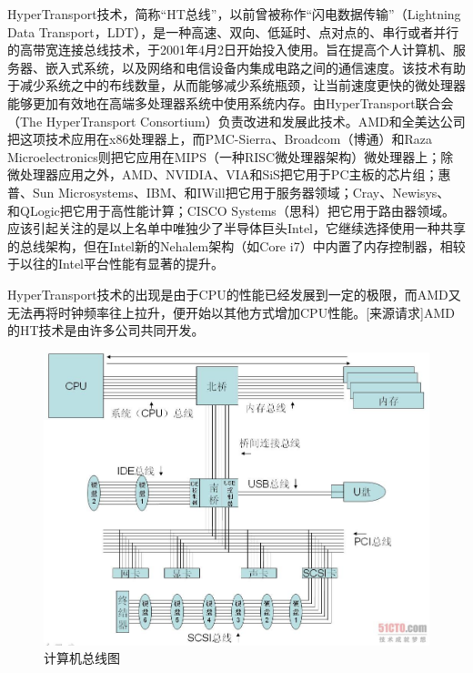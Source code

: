 HyperTransport技术，简称“HT总线”，以前曾被称作“闪电数据传输”（Lightning Data Transport，LDT），是一种高速、双向、低延时、点对点的、串行或者并行的高带宽连接总线技术，于2001年4月2日开始投入使用。旨在提高个人计算机、服务器、嵌入式系统，以及网络和电信设备内集成电路之间的通信速度。该技术有助于减少系统之中的布线数量，从而能够减少系统瓶颈，让当前速度更快的微处理器能够更加有效地在高端多处理器系统中使用系统内存。由HyperTransport联合会（The HyperTransport Consortium）负责改进和发展此技术。AMD和全美达公司把这项技术应用在x86处理器上，而PMC-Sierra、Broadcom（博通）和Raza Microelectronics则把它应用在MIPS（一种RISC微处理器架构）微处理器上；除微处理器应用之外，AMD、NVIDIA、VIA和SiS把它用于PC主板的芯片组；惠普、Sun Microsystems、IBM、和IWill把它用于服务器领域；Cray、Newisys、 和QLogic把它用于高性能计算；CISCO Systems（思科）把它用于路由器领域。应该引起关注的是以上名单中唯独少了半导体巨头Intel，它继续选择使用一种共享的总线架构，但在Intel新的Nehalem架构（如Core i7）中内置了内存控制器，相较于以往的Intel平台性能有显著的提升。

HyperTransport技术的出现是由于CPU的性能已经发展到一定的极限，而AMD又无法再将时钟频率往上拉升，便开始以其他方式增加CPU性能。[来源请求]AMD的HT技术是由许多公司共同开发。


\begin{figure}[htb]
\centering
\includegraphics[keepaspectratio,width=0.5\paperwidth]{Pictures/g.jpg}
\caption{计算机总线图}
\label{fig:computerbuspic}
\end{figure}



